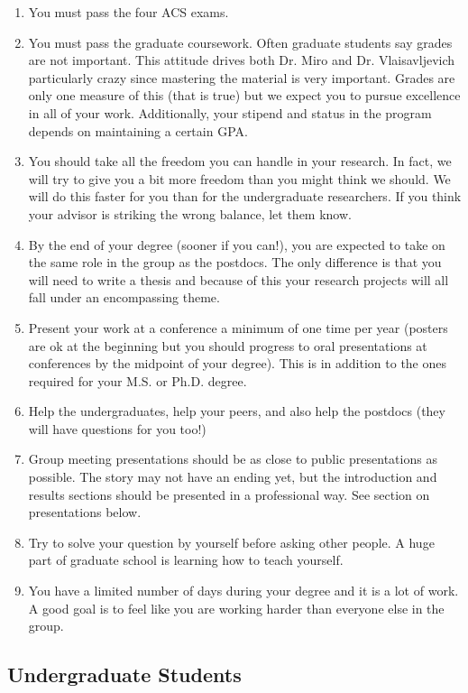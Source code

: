 \documentclass[letterpaper]{article}
\begin{document}
\begin{enumerate}
\item You must pass the four ACS exams.
\item You must pass the graduate coursework. Often graduate students say grades are not important. This attitude drives both Dr. Miro and Dr. Vlaisavljevich particularly crazy since mastering the material is very important. Grades are only one measure of this (that is true) but we expect you to pursue excellence in all of your work.  Additionally, your stipend and status in the program depends on maintaining a certain GPA.
\item You should take all the freedom you can handle in your research. In fact, we will try to give you a bit more freedom than you might think we should.  We will do this faster for you than for the undergraduate researchers. If you think your advisor is striking the wrong balance, let them know.
\item By the end of your degree (sooner if  you can!), you are expected to take on the same role in the group as the postdocs. The only difference is that you will need to write a thesis and because of this your research projects will all fall under an encompassing theme.
\item Present your work at a conference a minimum of one time per year (posters are ok at the beginning but you should progress to oral presentations at conferences by the midpoint of your degree). This is in addition to the ones required for your M.S. or Ph.D. degree.
\item Help the undergraduates, help your peers, and also help the postdocs (they will have questions for you too!)
\item Group meeting presentations should be as close to public presentations as possible. The story may not have an ending yet, but the introduction and results sections should be presented in a professional way. See section on presentations below.
\item Try to solve your question by yourself before asking other people. A huge part of graduate school is learning how to teach yourself.
\item You have a limited number of days during your degree and it is a lot of work. A good goal is to feel like you are working harder than everyone else in the group.
\end{enumerate}


\subsection*{Undergraduate Students}
\end{document}
